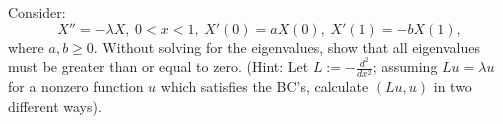 \documentclass[preview, border=10pt]{standalone}
\begin{document}
Consider:
    \begin{equation*}
    X'' = -\lambda X, \hspace{3pt} 0 < x < 1, \hspace{3pt} X'(0) = aX(0), \hspace{3pt} X'(1) = -b X(1),
    \end{equation*}
where $a,b \geq 0$. Without solving for the eigenvalues, show that all eigenvalues must be greater than or equal to zero. (Hint: Let $L := - \frac{d^2}{dx^2}$; assuming $Lu = \lambda u$ for a nonzero function $u$ which satisfies the BC's, calculate $(Lu,u)$ in two different ways).
\end{document}
